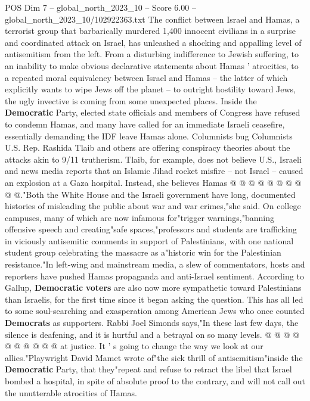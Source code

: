 \begin{textsample}{POS Dim 7 – global\_north\_2023\_10 – Score 6.00 – global\_north\_2023\_10/102922363.txt}  \label{ex:f7_pos_255}
The conflict between Israel and Hamas, a terrorist group that barbarically murdered 1,400 innocent civilians in a surprise and coordinated attack on Israel, has unleashed a shocking and appalling level of antisemitism from the left.
From a disturbing indifference to Jewish suffering, to an inability to make obvious declarative statements about Hamas ' atrocities, to a repeated moral equivalency between Israel and Hamas -- the latter of which explicitly wants to wipe Jews off the planet -- to outright hostility toward Jews, the ugly invective is coming from some unexpected places.
Inside the \textbf{Democratic} Party, elected state officials and members of Congress have refused to condemn Hamas, and many have called for an immediate Israeli ceasefire, essentially demanding the IDF leave Hamas alone.
Columnists bug Columnists U.S.
Rep.
Rashida Tlaib and others are offering conspiracy theories about the attacks akin to 9/11 trutherism.
Tlaib, for example, does not believe U.S., Israeli and news media reports that an Islamic Jihad rocket misfire -- not Israel -- caused an explosion at a Gaza hospital.
Instead, she believes Hamas @ @ @ @ @ @ @ @ @ @."Both the White House and the Israeli government have long, documented histories of misleading the public about war and war crimes,"she said.
On college campuses, many of which are now infamous for"trigger warnings,"banning offensive speech and creating"safe spaces,"professors and students are trafficking in viciously antisemitic comments in support of Palestinians, with one national student group celebrating the massacre as a"historic win for the Palestinian resistance."In left-wing and mainstream media, a slew of commentators, hosts and reporters have pushed Hamas propaganda and anti-Israel sentiment.
According to Gallup, \textbf{Democratic} \textbf{voters} are also now more sympathetic toward Palestinians than Israelis, for the first time since it began asking the question.
This has all led to some soul-searching and exasperation among American Jews who once counted \textbf{Democrats} as supporters.
Rabbi Joel Simonds says,"In these last few days, the silence is deafening, and it is hurtful and a betrayal on so many levels. @ @ @ @ @ @ @ @ @ @ at justice.
It ' s going to change the way we look at our allies."Playwright David Mamet wrote of"the sick thrill of antisemitism"inside the \textbf{Democratic} Party, that they"repeat and refuse to retract the libel that Israel bombed a hospital, in spite of absolute proof to the contrary, and will not call out the unutterable atrocities of Hamas.

\end{textsample}
